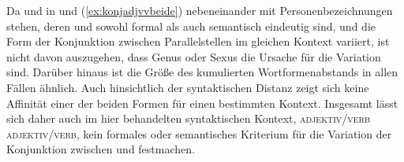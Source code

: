 \begin{exe}
	
\end{exe}

Da  und  in  und
(\ref{ex:konjadjvvbeide}) nebeneinander mit Personenbezeichnungen stehen, deren
 und  sowohl formal als auch semantisch eindeutig sind,
und die Form der Konjunktion zwischen Parallelstellen im
gleichen Kontext variiert, ist nicht davon auszugehen, dass Genus oder
Sexus die Ursache für die Variation sind. Darüber hinaus ist die Größe des
kumulierten Wortformenabstands in allen Fällen ähnlich.
Auch hinsichtlich der syntaktischen Distanz zeigt sich
keine Affinität einer der beiden Formen für einen bestimmten Kontext. Insgesamt
lässt sich daher auch im hier behandelten syntaktischen Kontext,
 \textsc{adjektiv/verb} 
\textsc{adjektiv/verb}, kein formales oder semantisches Kriterium
für die Variation der Konjunktion zwischen  und 
festmachen.



